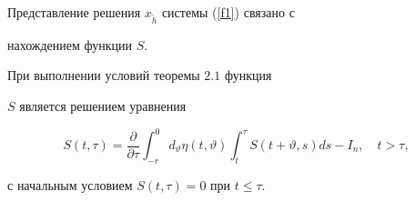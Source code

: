 Представление решения $x_{\widetilde{h}}$ системы (\ref{f1}) связано с 


нахождением функции $S$.





\begin{thms}


При выполнении условий теоремы $2.1$ функция 


$S$ является решением уравнения 


\begin{equation}


S (t,\tau)=\frac{\partial}{\partial\tau}\int_{-r}^{0}


d_{\vartheta}\eta (t,\vartheta) \int_{t}^{\tau}S (


t+\vartheta,s) ds-I_{n},\quad t>\tau,\label{G_ur_S_2}


\end{equation}


с начальным условием $S (t,\tau)=0$ при $t\leq\tau$.


\end{thms}





